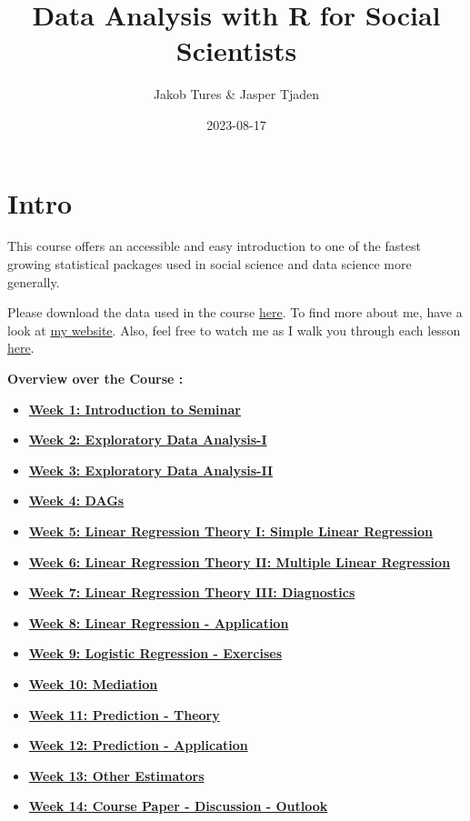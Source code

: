 \documentclass[
]{book}
\title{Data Analysis with R for Social Scientists}
\author{Jakob Tures \& Jasper Tjaden}
\date{2023-08-17}
\providecommand{\tightlist}{%
  \setlength{\itemsep}{0pt}\setlength{\parskip}{0pt}}
\begin{document}
\maketitle

{
\setcounter{tocdepth}{1}
\tableofcontents
}
\hypertarget{intro}{%
\chapter*{Intro}\label{intro}}

This course offers an accessible and easy introduction to one of the fastest growing statistical packages used in social science and data science more generally.

Please download the data used in the course \href{https://www.worldvaluessurvey.org/WVSDocumentationWV7.jsp}{here}. To find more about me, have a look at \href{https://jaspertjaden.com}{my website}. Also, feel free to watch me as I walk you through each lesson \href{https://www.youtube.com/playlist?list=PLr43hk2e3hFMg4tZdJsN0qzG5YkQB3A1c}{here}.

\textbf{Overview over the Course :}

\begin{itemize}
\tightlist
\item
  \textbf{\protect\hyperlink{intro-sem}{Week 1: Introduction to Seminar}}
\item
  \textbf{\protect\hyperlink{eda-1}{Week 2: Exploratory Data Analysis-I}}
\item
  \textbf{\protect\hyperlink{eda-2}{Week 3: Exploratory Data Analysis-II}}
\item
  \textbf{\protect\hyperlink{dags-1}{Week 4: DAGs}}
\item
  \textbf{\protect\hyperlink{lin-t-1}{Week 5: Linear Regression Theory I: Simple Linear Regression}}
\item
  \textbf{\protect\hyperlink{lin-t-2}{Week 6: Linear Regression Theory II: Multiple Linear Regression}}
\item
  \textbf{\protect\hyperlink{lin-t-3}{Week 7: Linear Regression Theory III: Diagnostics}}
\item
  \textbf{\protect\hyperlink{lin-a}{Week 8: Linear Regression - Application}}
\item
  \textbf{\protect\hyperlink{lin-e}{Week 9: Logistic Regression - Exercises}}
\item
  \textbf{\protect\hyperlink{med}{Week 10: Mediation}}
\item
  \textbf{\protect\hyperlink{pm-t}{Week 11: Prediction - Theory}}
\item
  \textbf{\protect\hyperlink{pm-a}{Week 12: Prediction - Application}}
\item
  \textbf{\protect\hyperlink{other-est}{Week 13: Other Estimators}}
\item
  \textbf{\protect\hyperlink{out-look}{Week 14: Course Paper - Discussion - Outlook}}
\end{itemize}
\end{document}
